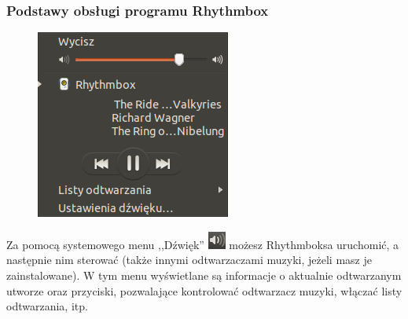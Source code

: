 \subsubsection{Podstawy obsługi programu Rhythmbox}
\begin{figure}
	\vspace{-10pt}
	\includegraphics[width=\linewidth]{images/programy_rhythmbox2.png}
\end{figure}

Za pomocą systemowego menu ,,Dźwięk'' \includegraphics{images/ikony_dzwiek.png} możesz Rhythmboksa uruchomić, a następnie nim sterować (także innymi odtwarzaczami muzyki, jeżeli masz je zainstalowane). W tym menu wyświetlane są informacje o aktualnie odtwarzanym utworze oraz przyciski, pozwalające kontrolować odtwarzacz muzyki, włączać listy odtwarzania, itp.

